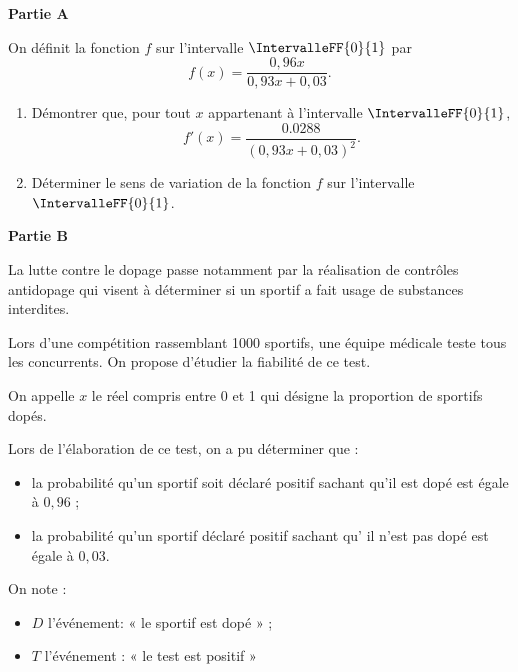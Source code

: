 \textbf{Partie A}

\medskip

On définit la fonction $f$ sur l'intervalle $\IntervalleFF{0}{1}$ par \[ f(x)=\frac{0,96x}{0,93x+0,03}. \]

\begin{enumerate}
	\item Démontrer que, pour tout $x$ appartenant à l'intervalle $\IntervalleFF{0}{1}$, \[ f'(x)=\frac{\num{0,0288}}{(0,93x+0,03)^2}. \]
	\item Déterminer le sens de variation de la fonction $f$ sur l'intervalle $\IntervalleFF{0}{1}$.
\end{enumerate}

\smallskip

\textbf{Partie B}

\medskip


La lutte contre le dopage passe notamment par la réalisation de contrôles antidopage qui visent à déterminer si un sportif a fait usage de substances interdites.

Lors d'une compétition rassemblant \num{1000} sportifs, une équipe médicale teste tous les concurrents. On propose d'étudier la fiabilité de ce test.

\medskip

On appelle $x$ le réel compris entre 0 et 1 qui désigne la proportion de sportifs dopés.

\medskip

Lors de l'élaboration de ce test, on a pu déterminer que :

\begin{itemize}
	\item la probabilité qu'un sportif soit déclaré positif sachant qu'il est dopé est égale à $0,96$ ;
	\item la probabilité qu'un sportif déclaré positif sachant qu' il n'est pas dopé est égale à $0,03$.
\end{itemize}

On note :

\begin{itemize}
	\item $D$ l'événement: « le sportif est dopé » ;
	\item $T$ l'événement : « le test est positif » 
\end{itemize}

